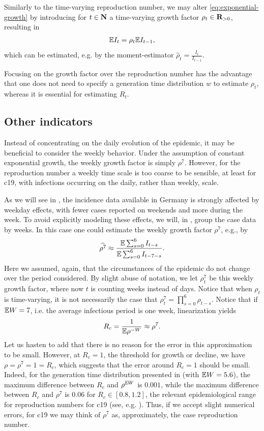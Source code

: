 Similarly to the time-varying reproduction number, we may alter \eqref{eq:exponential-growth} by introducing for $t \in \mathbf N$ a time-varying growth factor $\rho_{t} \in \mathbf R_{> 0}$, resulting in 
\begin{align}
    \label{eq:exponential-growth-time-varying}
    \mathbb E I_{t} = \rho_t \mathbb E I_{t - 1},
\end{align}
which can be estimated, e.g. by the moment-estimator $\hat \rho_{t} = \frac{I_{t}}{I_{t - 1}}$. 

Focusing on the growth factor over the reproduction number has the advantage that one does not need to specify a generation time distribution $w$ to estimate $\rho_{t}$, whereas it is essential for estimating $R_{t}$. 

\subsection{Other indicators}
\label{subsec:other_indicat}
Instead of concentrating on the daily evolution of the epidemic, it may be beneficial to consider the weekly behavior. Under the assumption of constant exponential growth, the weekly growth factor is simply $\rho^{7}$. However, for the reproduction number a weekly time scale is too coarse to be sensible, at least for \gls{c19}, with infections occurring on the daily, rather than weekly, scale.

As we will see in , the incidence data available in Germany is strongly affected by weekday effects, with fewer cases reported on weekends and more during the week. To avoid explicitly modeling these effects, we will, in , group the case data by weeks. In this case one could estimate the weekly growth factor $\rho^{7}$, e.g., by
\begin{align}
    \label{eq:rho7_smooth}
    \widehat{\rho^{7}} \approx \frac{ \mathbb E \sum_{s = 0}^{6} I_{t - s}}{\mathbb E \sum_{s = 0}^6 I_{t - 7 - s}}.
\end{align}
Here we assumed, again, that the circumstances of the epidemic do not change over the period considered. By slight abuse of notation, we let $\rho^{7}_t$ be this weekly growth factor, where now $t$ is counting weeks instead of days. Notice that when $\rho_{t}$ is time-varying, it is not necessarily the case that $\rho^{7}_t = \prod_{s = 0}^{6} \rho_{t - s}$. Notice that if $\mathbb E W = 7$, i.e. the average infectious period is one week, linearization yields
$$
    R_{c} = \frac{1}{\mathbb E \rho^{-W}} \approx \rho^{7}.
$$
Let us hasten to add that there is no reason for the error in this approximation to be small. 
However, at $R_{c} = 1$, the threshold for growth or decline, we have $\rho = \rho^{7} = 1 = R_{c}$, which suggests that the error around $R_{c} = 1$ should be small. Indeed, for the generation time distribution presented in  (with $\mathbb E W = 5.6$), the maximum difference between $R_{c}$ and $\rho^{\mathbb E W}$ is $0.001$, while the maximum difference between $R_{c}$ and $\rho^{7}$ is $0.06$ for $R_{c} \in [0.8, 1.2]$, the relevant epidemiological range for reproduction numbers for \gls{c19} (see, e.g. ).
Thus, if we accept slight numerical errors, for \gls{c19} we may think of $\rho^{7}$ as, approximately, the case reproduction number. 

